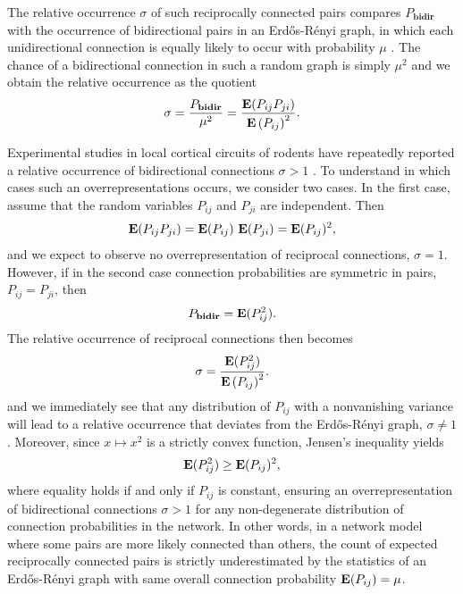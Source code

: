The relative occurrence $\sigma$ of such reciprocally connected pairs compares $P_{\mathbf{bidir}}$ with the occurrence of bidirectional pairs in an Erd\H{o}s-R\'{e}nyi graph, in which each unidirectional connection is equally likely to occur with probability $\mu$ \cite{Gilbert1959, Erdos1959}. The chance of a bidirectional connection in such a random graph is simply $\mu^2$ and we obtain the relative occurrence as the quotient
\begin{align}
\sigma = \frac{P_{\mathbf{bidir}}}{\mu^2} = \frac{\operatorname{\mathbf{E}}(P_{ij}P_{ji})}{{\operatorname{\mathbf{E}}\left(P_{ij}\right)}^2}.
\end{align}

Experimental studies in local cortical circuits of rodents have repeatedly reported a relative occurrence of bidirectional connections $\sigma > 1$ \cite{Markram1997, Song2005, Perin2011}. To understand in which cases such an overrepresentations occurs, we consider two cases. In the first case, assume that the random variables $P_{ij}$ and $P_{ji}$ are independent. Then
\begin{align}
\operatorname{\mathbf{E}}(P_{ij} P_{ji}) = \operatorname{\mathbf{E}}(P_{ij})\,\operatorname{\mathbf{E}}(P_{ji}) = \operatorname{\mathbf{E}}(P_{ij})^2,
\end{align}
and we expect to observe no overrepresentation of reciprocal connections, $\sigma = 1$. However, if in the second case connection probabilities are symmetric in pairs, $P_{ij} = P_{ji}$, then 
\begin{align}
P_{\mathbf{bidir}} = \operatorname{\mathbf{E}}(P_{ij}^2).
\end{align}
%
The relative occurrence of reciprocal connections then becomes
\begin{align}
\sigma = \frac{\operatorname{\mathbf{E}}(P_{ij}^2)}{{\operatorname{\mathbf{E}}\left(P_{ij}\right)}^2}.
\end{align}
and we immediately see that any distribution of $P_{ij}$ with a nonvanishing variance will lead to a relative occurrence that deviates from the Erd\H{o}s-R\'{e}nyi graph, $\sigma \neq 1$. Moreover, since $x \mapsto x^2$ is a strictly convex function, Jensen's inequality yields
\begin{align}
\operatorname{\mathbf{E}}(P_{ij}^2) \geq \operatorname{\mathbf{E}}(P_{ij})^2,
\end{align}
where equality holds if and only if $P_{ij}$ is constant, ensuring an overrepresentation of bidirectional connections $\sigma > 1$ for any non-degenerate distribution of connection probabilities in the network. In other words, in a network model where some pairs are more likely connected than others, the count of expected reciprocally connected pairs is strictly underestimated by the statistics of an Erd\H{o}s-R\'{e}nyi graph with same overall connection probability $\operatorname{\mathbf{E}}(P_{ij}) = \mu$.





